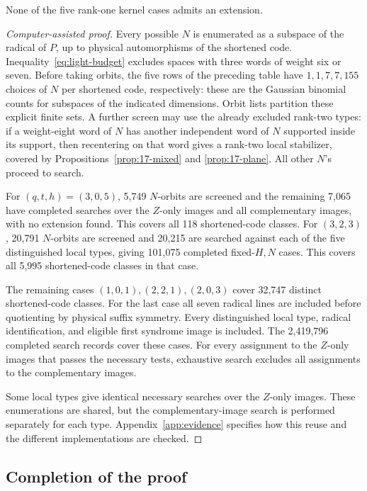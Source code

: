 \begin{proposition}\label{prop:17-rankone}
None of the five rank-one kernel cases admits an extension.
\end{proposition}
\begin{proof}[Computer-assisted proof]
Every possible \(N\) is enumerated as a subspace of the radical of
\(P\), up to physical automorphisms of the shortened code.
Inequality~\eqref{eq:light-budget} excludes spaces with three words of
weight six or seven.
Before taking orbits, the five rows of the preceding table have
\(1,1,7,7,155\) choices of \(N\) per shortened code, respectively:
these are the Gaussian binomial counts for subspaces of the indicated
dimensions. Orbit lists partition these explicit finite sets.
A further screen may use the already excluded rank-two types: if a
weight-eight word of \(N\) has another independent word of \(N\)
supported inside its support, then recentering on that word gives a
rank-two local stabilizer, covered by Propositions~\ref{prop:17-mixed}
and \ref{prop:17-plane}. All other \(N\)'s proceed to search.

For \((q,t,h)=(3,0,5)\), 5,749 \(N\)-orbits are screened and the
remaining 7,065 have completed searches over the \(Z\)-only images
and all complementary images, with no extension found. This covers all 118 shortened-code classes.
For \((3,2,3)\), 20,791 \(N\)-orbits are screened and 20,215 are
searched against each of the five distinguished local types, giving
101,075 completed fixed-\(H,N\) cases. This covers all 5,995 shortened-code
classes in that case.

The remaining cases \((1,0,1),(2,2,1),(2,0,3)\) cover 32,747 distinct
shortened-code classes. For the last case all seven radical lines are included
before quotienting by physical suffix symmetry. Every distinguished local
type, radical identification, and eligible first syndrome image is included.
The 2,419,796 completed search records cover these cases. For every
assignment to the \(Z\)-only images that passes the necessary tests,
exhaustive search excludes all assignments to the complementary images.

Some local types give identical necessary searches over the \(Z\)-only
images. These enumerations are shared, but the complementary-image search
is performed separately for each type. Appendix~\ref{app:evidence}
specifies how this reuse and the different implementations are checked.
\end{proof}

\subsection{Completion of the proof}

